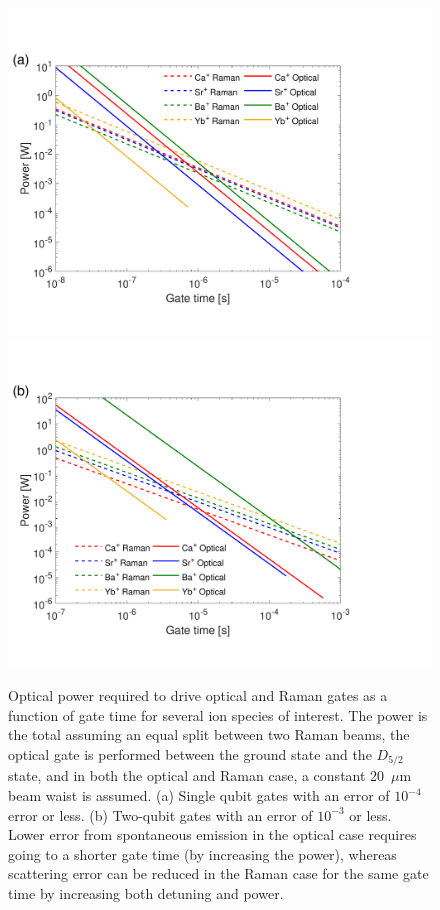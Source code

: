 \documentclass[%
reprint,
 amsmath,amssymb,
]{revtex4-1}
\begin{document}
\begin{figure}[t b]
\includegraphics[width=1.0\columnwidth]{gate_comp_1qg_v5.pdf}\\
\includegraphics[width=1.0\columnwidth]{gate_comp_2qg_v5.pdf}
\caption{Optical power required to drive optical and Raman gates as a function of gate time for several ion species of interest.  The power is the total assuming an equal split between two Raman beams, the optical gate is performed between the ground state and the $D_{5/2}$ state, and in both the optical and Raman case, a constant 20~$\mu$m beam waist is assumed.  (a) Single qubit gates with an error of $10^{-4}$ error or less. (b) Two-qubit gates with an error of $10^{-3}$ or less.  Lower error from spontaneous emission in the optical case requires going to a shorter gate time (by increasing the power), whereas scattering error can be reduced in the Raman case for the same gate time by increasing both detuning and power.}
\label{fig:gate_comparison}
\end{figure}
\end{document}
